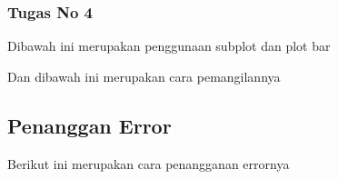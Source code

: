 \subsubsection{Tugas No 4}

\hfill \break

Dibawah ini merupakan penggunaan subplot dan plot bar

Dan dibawah ini merupakan cara pemangilannya



\subsection{Penanggan Error}

\hfill \break

Berikut ini merupakan cara penangganan errornya

